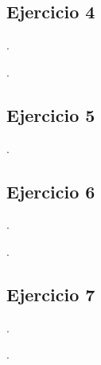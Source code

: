 
\begin{Enunciado}
	\subsection*{Ejercicio 4}
    
	\lipsum[1].
\end{Enunciado}

\vspace*{1em}

\lipsum[1].

\vspace*{2em}

\begin{Enunciado}
	\subsection*{Ejercicio 5}
    
	\lipsum[1].
\end{Enunciado}

\vspace*{1em}

\lipsum[1]

\vspace*{2em}


\begin{Enunciado}
	\subsection*{Ejercicio 6}
	\lipsum[1].
\end{Enunciado}

\vspace*{1em}

\lipsum[1].

\vspace*{2em}

\begin{Enunciado}
	\subsection*{Ejercicio 7}
	\lipsum[1].
\end{Enunciado}
\vspace*{1em}
\lipsum[1].
\vspace*{2em}

